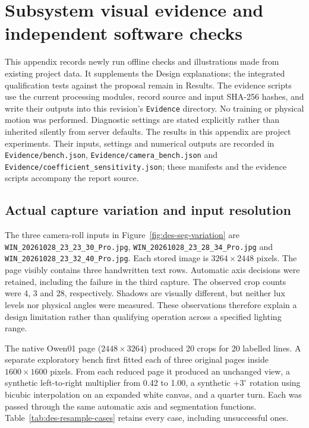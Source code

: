 \section{Subsystem visual evidence and independent software checks}
\label{app:des-visual-tests}
This appendix records newly run offline checks and illustrations made from existing project data. It supplements the Design explanations; the integrated qualification tests against the proposal remain in Results. The evidence scripts use the current processing modules, record source and input SHA-256 hashes, and write their outputs into this revision's \texttt{Evidence} directory. No training or physical motion was performed. Diagnostic settings are stated explicitly rather than inherited silently from server defaults. The results in this appendix are project experiments. Their inputs, settings and numerical outputs are recorded in \texttt{Evidence/bench.json}, \texttt{Evidence/camera\_bench.json} and \texttt{Evidence/coefficient\_sensitivity.json}; these manifests and the evidence scripts accompany the report source.

\subsection{Actual capture variation and input resolution}
The three camera-roll inputs in Figure~\ref{fig:des-seg-variation} are \texttt{WIN\_20261028\_23\_23\_30\_Pro.jpg}, \texttt{WIN\_20261028\_23\_28\_34\_Pro.jpg} and \texttt{WIN\_20261028\_23\_32\_40\_Pro.jpg}. Each stored image is $3264\times2448$ pixels. The page visibly contains three handwritten text rows. Automatic axis decisions were retained, including the failure in the third capture. The observed crop counts were 4, 3 and 28, respectively. Shadows are visually different, but neither lux levels nor physical angles were measured. These observations therefore explain a design limitation rather than qualifying operation across a specified lighting range.

The native Owen01 page ($2448\times3264$) produced 20 crops for 20 labelled lines. A separate exploratory bench first fitted each of three original pages inside $1600\times1600$ pixels. From each reduced page it produced an unchanged view, a synthetic left-to-right multiplier from 0.42 to 1.00, a synthetic $+3^\circ$ rotation using bicubic interpolation on an expanded white canvas, and a quarter turn. Each was passed through the same automatic axis and segmentation functions. Table~\ref{tab:des-resample-cases} retains every case, including unsuccessful ones.

